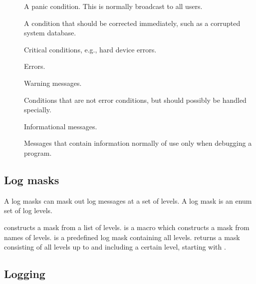 \begin{description}
\item[]
  A panic condition.  This is normally broadcast to all users.

\item[]
  A condition that should be corrected immediately, such as a
  corrupted system database.

\item[]
  Critical conditions, e.g., hard device errors.

\item[]
  Errors.

\item[]
  Warning messages.

\item[]
  Conditions that are not error conditions, but should possibly be
  handled specially.

\item[]
  Informational messages.

\item[]
  Messages that contain information normally of use only when
  debugging a program.
\end{description}

\subsection*{Log masks}

A log masks can mask out log messages at a set of levels.  A log
mask is an enum set of log levels.


\begin{desc}
   constructs a mask from a list of levels.
   is a macro which constructs a mask from names of
  levels.   is a predefined log mask containing
  all levels.   returns a mask consisting of all
  levels up to and including a certain level, starting with
  .
\end{desc}

\subsection*{Logging}


